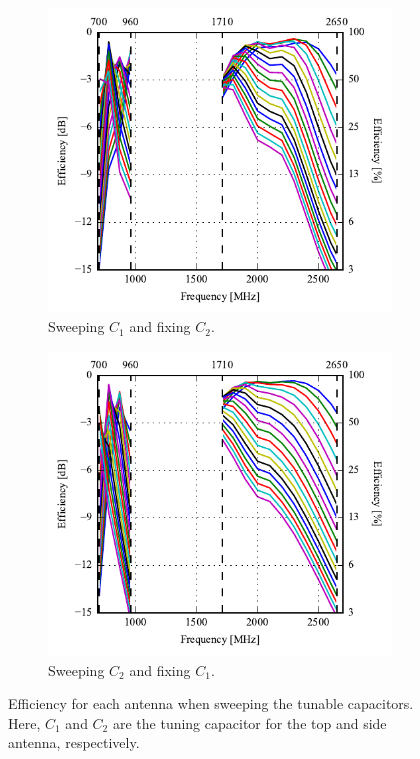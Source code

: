 \begin{figure}[htbp]
    \centering
    \begin{subfigure}{0.49\linewidth}
        \includegraphics{img/tech_sol/monopole/5mm/6pf_eff_ac1}
        \caption{Sweeping $C_1$ and fixing $C_2$.}
    \end{subfigure}
    \hfill
    \begin{subfigure}{0.49\linewidth}
        \includegraphics{img/tech_sol/monopole/5mm/6pf_eff_ac2}
        \caption{Sweeping $C_2$ and fixing $C_1$.}
    \end{subfigure}
    \caption{Efficiency for each antenna when sweeping the tunable capacitors. Here, $C_1$ and $C_2$ are the tuning capacitor for the top and side antenna, respectively.}
    \label{fig:eff_sol1_6pf_free}
\end{figure}


